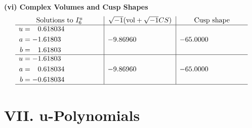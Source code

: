 \documentclass[1p]{elsarticle_modified}
\theoremstyle{definition}
\newcommand{\I}{\sqrt{-1}}
\begin{document}
\newpage\flushleft \textbf{(vi) Complex Volumes and Cusp Shapes}
$$\begin{array}{c|c|c}  
\text{Solutions to }I^u_{6}& \I (\text{vol} + \sqrt{-1}CS) & \text{Cusp shape}\\
 \hline 
\begin{aligned}
u &= \phantom{-}0.618034\phantom{ +0.000000I} \\
a &= -1.61803\phantom{ +0.000000I} \\
b &= \phantom{-}1.61803\phantom{ +0.000000I}\end{aligned}
 & -9.86960\phantom{ +0.000000I} & -65.0000\phantom{ +0.000000I} \\ \hline\begin{aligned}
u &= -1.61803\phantom{ +0.000000I} \\
a &= \phantom{-}0.618034\phantom{ +0.000000I} \\
b &= -0.618034\phantom{ +0.000000I}\end{aligned}
 & -9.86960\phantom{ +0.000000I} & -65.0000\phantom{ +0.000000I}\\
 \hline 
 \end{array}$$\newpage
\newpage\renewcommand{\arraystretch}{1}
\centering \section*{ VII. u-Polynomials}
\end{document}
